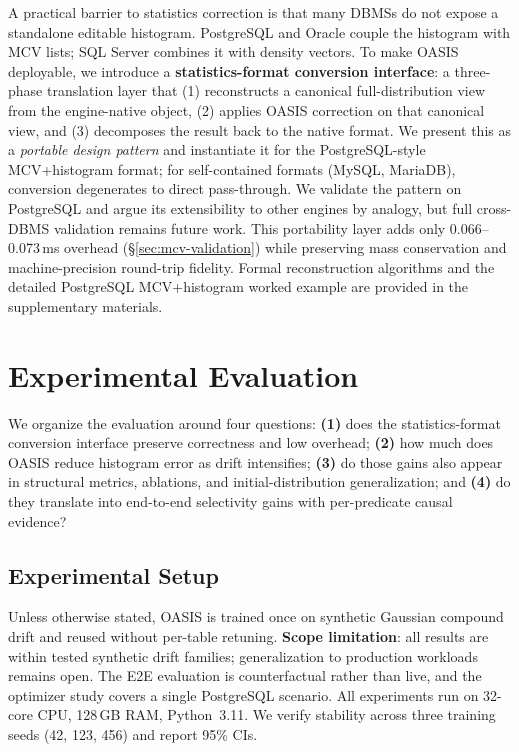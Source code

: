 \documentclass[runningheads]{llncs}
\begin{document}
A practical barrier to statistics correction is that many DBMSs do not expose a standalone editable histogram. PostgreSQL and Oracle couple the histogram with MCV lists; SQL Server combines it with density vectors. To make OASIS deployable, we introduce a \textbf{statistics-format conversion interface}: a three-phase translation layer that (1) reconstructs a canonical full-distribution view from the engine-native object, (2) applies OASIS correction on that canonical view, and (3) decomposes the result back to the native format.
We present this as a \emph{portable design pattern} and instantiate it for the PostgreSQL-style MCV+histogram format; for self-contained formats (MySQL, MariaDB), conversion degenerates to direct pass-through. We validate the pattern on PostgreSQL and argue its extensibility to other engines by analogy, but full cross-DBMS validation remains future work.
This portability layer adds only 0.066--0.073\,ms overhead (\S\ref{sec:mcv-validation}) while preserving mass conservation and machine-precision round-trip fidelity.
Formal reconstruction algorithms and the detailed PostgreSQL MCV+histogram worked example are provided in the supplementary materials.


\section{Experimental Evaluation}
\label{sec:experiments}

We organize the evaluation around four questions: \textbf{(1)} does the statistics-format conversion interface preserve correctness and low overhead; \textbf{(2)} how much does OASIS reduce histogram error as drift intensifies; \textbf{(3)} do those gains also appear in structural metrics, ablations, and initial-distribution generalization; and \textbf{(4)} do they translate into end-to-end selectivity gains with per-predicate causal evidence?

\subsection{Experimental Setup}
\label{sec:setup}

Unless otherwise stated, OASIS is trained once on synthetic Gaussian compound drift and reused without per-table retuning. \textbf{Scope limitation}: all results are within tested synthetic drift families; generalization to production workloads remains open. The E2E evaluation is counterfactual rather than live, and the optimizer study covers a single PostgreSQL scenario. All experiments run on 32-core CPU, 128\,GB RAM, Python~3.11. We verify stability across three training seeds (42, 123, 456) and report 95\% CIs.
\end{document}
